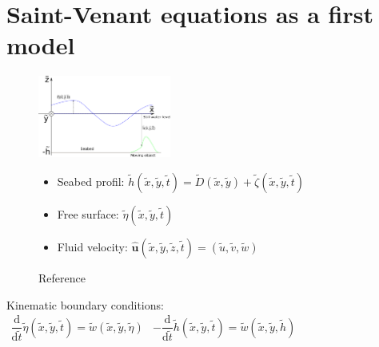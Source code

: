\documentclass[compress,t]{beamer}
\begin{document}
  		\begin{frame}
			\tableofcontents
		\end{frame}
	\section{Saint-Venant equations as a first model}
  			\begin{frame}
				\begin{figure}
				\centering
 					\begin{minipage}[t]{0.3\linewidth}
 					\centering
 						\includegraphics[height=2.7cm]{CartesianCoordinates}
						\caption{Reference}
 					\end{minipage} \hfill
 					\begin{minipage}[b]{0.6\linewidth}
 						\begin{itemize}
							\item Seabed profil: $\tilde h(\tilde x,\tilde y,\tilde t) = \tilde D(\tilde x,\tilde y) +\tilde  \zeta(\tilde x,\tilde y,\tilde t)$
							\item Free surface: $\tilde{\eta}(\tilde x,\tilde y,\tilde t)$
							\item Fluid velocity: $\hat{\mathbf{u}}(\tilde x,\tilde y,\tilde z,\tilde t)=(\tilde u,\tilde v,\tilde w)$
						\end{itemize}
 					\end{minipage}
				\end{figure}
				\pause
				Kinematic boundary conditions: 
				$\begin{array}{lr}
					\dfrac{\mathrm{d}}{\mathrm{d} \tilde t} \tilde  \eta(\tilde x,\tilde y,\tilde t) = \tilde w(\tilde x,\tilde y, \tilde \eta) & -\dfrac{\mathrm{d}}{\mathrm{d} \tilde t} \tilde h(\tilde x, \tilde y, \tilde t) = \tilde w(\tilde x,\tilde y,\tilde h)
				\end{array}$
			\end{frame}
\end{document}
